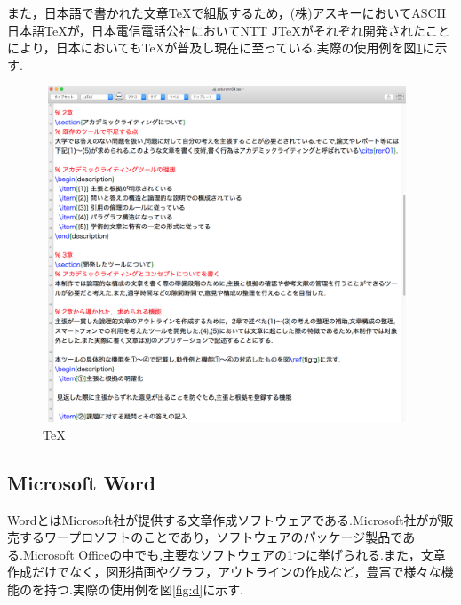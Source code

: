\documentclass[a4j,12pt]{jarticle}
\begin{document}
また，日本語で書かれた文章\TeX で組版するため，(株)アスキーにおいてASCII日本語\TeX が，日本電信電話公社においてNTT J\TeX がそれぞれ開発されたことにより，日本においても\TeX が普及し現在に至っている\cite{ren3}.実際の使用例を図\ref{fig:c}に示す.

\begin{figure}[H]
\begin{center}
 \includegraphics[clip,width=110mm,height=100mm]{TEX.png}
 \end{center}
 \caption{\TeX}
 \label{fig:c}
\end{figure}

\subsection{Microsoft Word}
WordとはMicrosoft社が提供する文章作成ソフトウェアである.Microsoft社がが販売するワープロソフトのことであり，ソフトウェアのパッケージ製品である.Microsoft Officeの中でも,主要なソフトウェアの1つに挙げられる.また，文章作成だけでなく，図形描画やグラフ，アウトラインの作成など，豊富で様々な機能のを持つ.実際の使用例を図\ref{fig:d}に示す.
\end{document}
